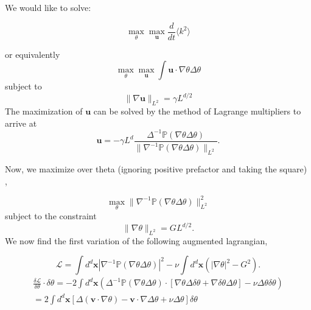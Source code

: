 \documentclass[12pt]{article}
\begin{document}
We would like to solve: 

\begin{equation}
\max_{\theta}\max_{\mathbf{u}} \frac{d}{dt}\langle k^2 \rangle 
\end{equation}

or equivalently
\begin{equation}
\max_{\theta}\max_{\mathbf{u}} \int \mathbf{u}\cdot \nabla \theta \Delta \theta
\end{equation}
subject to 
\begin{equation}
\|\nabla\mathbf{u}\|_{L^{2}}=\gamma L^{d/2}
\end{equation}
The maximization of $\mathbf{u}$ can be solved by the method of Lagrange multipliers to arrive at
\begin{equation}
\mathbf{u} = - \gamma L^{d}\frac{\Delta^{-1}\mathds{P}(\nabla \theta \Delta \theta)}{\|\nabla^{-1}\mathds{P}(\nabla\theta \Delta \theta )\|_{L^{2}}}.
\end{equation}

Now, we maximize over theta (ignoring positive prefactor and taking the square) ,

\begin{equation}
\max_{\theta}\|\nabla^{-1}\mathds{P}(\nabla\theta \Delta \theta )\|_{L^{2}}^{2}
\end{equation}
subject to the constraint 
\begin{equation}
\|\nabla \theta\|_{L^2}=GL^{d/2}.
\end{equation}
We now find the first variation of the following augmented lagrangian,

\begin{equation}
\mathcal{L}=\int d^{d}\mathbf{x}|\nabla^{-1}\mathds{P}(\nabla\theta \Delta \theta )|^{2} - \nu \int d^{d}\mathbf{x} \left(|\nabla \theta|^{2} - G^{2}\right).
\end{equation}
\begin{subequations}
\begin{align}
\frac{\delta \mathcal{L} }{\delta \theta}\cdot \delta \theta = -2\int d^{d}\mathbf{x}\left(
\Delta^{-1} \mathds{P}(\nabla\theta \Delta \theta)\cdot [\nabla \theta\Delta\delta\theta + \nabla\delta\theta \Delta\theta] - \nu \Delta \theta \delta \theta \right) \\
 = 2\int d^{d}\mathbf{x}
[\Delta (\mathbf{v}\cdot \nabla \theta) -  \mathbf{v}\cdot\nabla\Delta\theta + \nu \Delta \theta ] \delta \theta
\end{align}
\end{subequations}
\end{document}
